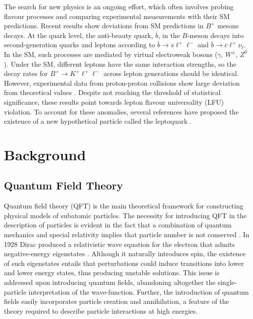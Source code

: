 The search for new physics is an ongoing effort, which often involves probing flavour processes and comparing experimental measurements with their SM predictions. Recent results show deviations from SM predictions in $B^+$ mesons decays. At the quark level, the anti-beauty quark, $\overline{b}$, in the $B$-meson decays into second-generation quarks and leptons according to $\overline{b}\rightarrow \overline{s}\ell^+ \ell^-$ and $\overline{b}\rightarrow \overline{c}\ell^+ \nu_\ell$. In the SM, such processes are mediated by virtual electroweak bosons ($\gamma$, $W^\pm$, $Z^0$). Under the SM, different leptons have the same interaction strengths, so the decay rates for $B^+ \rightarrow K^+\ell^+\ell^-$ across lepton generations should be identical. However, experimental data from proton-proton collisions show large deviation from theoretical values \cite{lhcbcollaboration2021test, lhcb_measurement}. Despite not reaching the threshold of statistical significance, these results point towards lepton flavour universality (LFU) violation. To account for these anomalies, several references have proposed the existence of a new hypothetical particle called the leptoquark \cite{alonso_lepton_2015,FAJFER2016270,ASSAD2018324,blanke_b_2018,barbieri_b-decay_2018,calibbi_model_2018,di_luzio_gauge_2017,bhattacharya_simultaneous_2017}.

\section{Background}
\subsection{Quantum Field Theory}

Quantum field theory (QFT) is the main theoretical framework for constructing physical models of subatomic particles. The necessity for introducing QFT in the description of particles is evident in the fact that a combination of quantum mechanics and special relativity implies that particle number is not conserved \cite{zee_quantum_2010}. In 1928 Dirac produced a relativistic wave equation for the electron that admits negative-energy eigenstates \cite{shankar_principles_1994}. Although it naturally introduces spin, the existence of such eigenstates entails that perturbations could induce transitions into lower and lower energy states, thus producing unstable solutions. This issue is addressed upon introducing quantum fields, abandoning altogether the single-particle interpretation of the wave-function. Further, the introduction of quantum fields easily incorporates particle creation and annihilation, a feature of the theory required to describe particle interactions at high energies.

